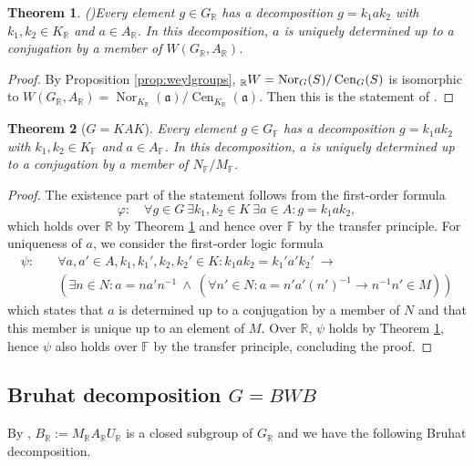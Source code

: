 \documentclass[12pt]{amsart}
\newcommand{\F}{\mathbb{F} }
\newcommand{\R}{\mathbb{R} }
\newcommand{\fraka}{\mathfrak{a}}
\newcommand{\RW}{\vphantom{W}_{\R}W}
\numberwithin{equation}{section}
\newtheorem{theorem}{Theorem}[section]
\theoremstyle{remark} %
\begin{document}
\begin{theorem}(\cite[Theorem 7.39]{Kna})\label{thm:KAK_R}
	Every element $g\in G_{\R}$ has a decomposition $g = k_1 a k_2$ with $k_1,k_2 \in K_{\R}$ and $a \in A_{\R}$. In this decomposition, $a$ is uniquely determined up to a conjugation by a member of $W(G_{\R},A_{\R})$.
\end{theorem}
\begin{proof}
	By Proposition \ref{prop:weylgroups},
	$\RW = \operatorname{Nor}_G(S)/\operatorname{Cen}_G(S)$ is isomorphic to $W(G_{\R},A_{\R}) = \operatorname{Nor}_{K_{\R}}(\fraka)/\operatorname{Cen}_{K_{\R}}(\fraka)$. Then this is the statement of \cite[Theorem 7.39]{Kna}. 
\end{proof}

\begin{theorem}[$G=KAK$]\label{thm:KAK}
	Every element $g\in G_\F$ has a decomposition $g = k_1 a k_2$ with $k_1,k_2 \in K_{\F}$ and $a \in A_{\F}$. In this decomposition, $a$ is uniquely determined up to a conjugation by a member of $N_{\F}/M_{\F}$.
\end{theorem}
\begin{proof}
	The existence part of the statement follows from the first-order formula
	$$
	\varphi \colon \quad \forall g \in G\  \exists k_1 ,k_2 \in K\ \exists a \in A \colon g =k_1ak_2,
	$$
	which holds over $\R$ by Theorem \ref{thm:KAK_R} and hence over $\F$ by the transfer principle. For uniqueness of $a$, we consider the first-order logic formula
	\begin{align*}
		\psi \colon \quad & \forall a,a' \in A, k_1,k_1',k_2,k_2' \in K \colon k_1ak_2 = k_1'a'k_2' \  \to \\
		&\left( \exists n \in N \colon a = na'n^{-1} \ \wedge \ \left(\forall n' \in N \colon a=n'a'(n')^{-1} \to n^{-1}n' \in M \right) \right)
	\end{align*}
	which states that $a$ is determined up to a conjugation by a member of $N$ and that this member is unique up to an element of $M$. Over $\R$, $\psi$ holds by Theorem \ref{thm:KAK_R}, hence $\psi$ also holds over $\F$ by the transfer principle, concluding the proof.
\end{proof}

\subsection{Bruhat decomposition $G=BWB$}\label{sec:BWB}

By \cite[page 398]{Kna}, $B_{\R} := M_{\R}A_{\R}U_{\R}$ is a closed subgroup of $G_{\R}$ and we have the following Bruhat decomposition.
\end{document}

